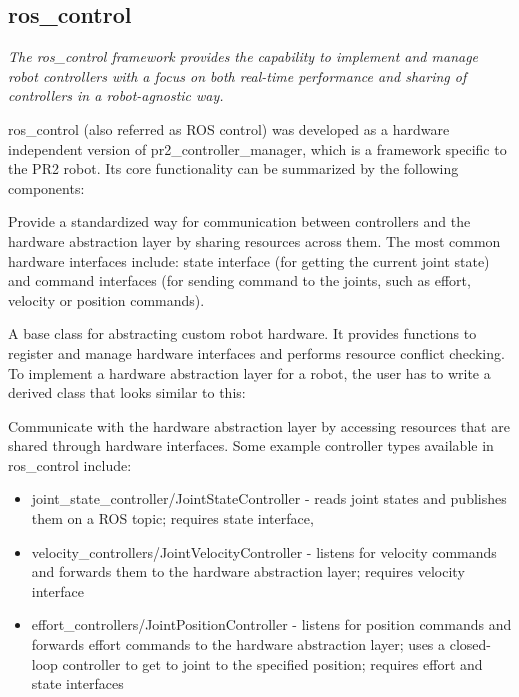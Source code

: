 \documentclass[english,inz,shortabstract]{iithesis}
\begin{document}
    \subsection{ros\_control}
    
    \textit{The ros\_control framework provides the capability to implement and manage robot controllers with a focus on both real-time performance and sharing of controllers in a robot-agnostic way.} 
    \cite{ros_control:paper}
    
    \textsf{ros\_control} (also referred as \textsf{ROS control}) was developed as a hardware independent version of \textsf{pr2\_controller\_manager}, which is a framework specific to the PR2 robot. Its core functionality can be summarized by the following components:

    \begin{description}[style=nextline]
        \item [Hardware interfaces]
        Provide a standardized way for communication between controllers and the hardware abstraction layer by sharing resources across them. The most common hardware interfaces include: state interface (for getting the current joint state) and command interfaces (for sending command to the joints, such as effort, velocity or position commands).   
        \item [RobotHW]
        A base class for abstracting custom robot hardware. It provides functions to register and manage hardware interfaces and performs resource conflict checking. To implement a hardware abstraction layer for a robot, the user has to write a derived class that looks similar to this:
        
        \item [Controllers]
        Communicate with the hardware abstraction layer by accessing resources that are shared through hardware interfaces. Some example controller types available in \textsf{ros\_control} include:
            \begin{itemize}
                \item \textsf{joint\_state\_controller/JointStateController} - reads joint states and publishes them on a ROS topic; requires state interface,
                \item \textsf{velocity\_controllers/JointVelocityController} - listens for velocity commands and forwards them to the hardware abstraction layer; requires velocity interface
                \item \textsf{effort\_controllers/JointPositionController} - listens for position commands and forwards effort commands to the hardware abstraction layer; uses a closed-loop controller to get to joint to the specified position; requires effort and state interfaces

\end{itemize}
\end{description}
\end{document}
